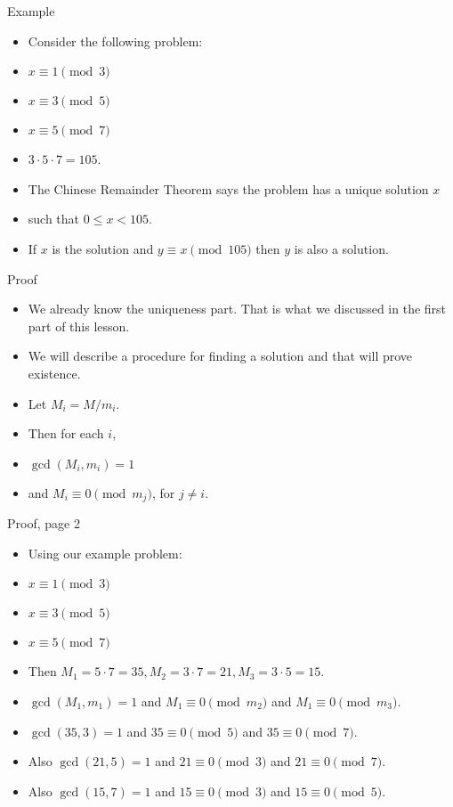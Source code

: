 \documentclass[handout]{beamer}
\begin{document}
\begin{frame}{Example}

\begin{itemize}
  \item Consider the following problem:
  \item $x \equiv 1 \pmod 3$
  \item $x \equiv 3 \pmod 5$
  \item $x \equiv 5 \pmod 7$
  \item $3\cdot 5 \cdot 7 = 105$.
  \item The Chinese Remainder Theorem says the problem has a unique solution $x$
  \item such that $0\leq x < 105$.
  \item If $x$ is the solution and $y\equiv x \pmod {105}$ then $y$ is also a solution.
\end{itemize}

\end{frame}

\begin{frame}{Proof}

\begin{itemize}
  \item We already know the uniqueness part. That is what we discussed in the first part of this lesson.
  \item We will describe a procedure for finding a solution and that will prove existence.
  \item Let $M_i = M/{m_i}$.
  \item Then for each $i$,
  \item $\gcd(M_i, m_i) = 1$
  \item and $M_i \equiv 0 \pmod {m_j}$, for $j\not= i$.

\end{itemize}

\end{frame}

\begin{frame}{Proof, page 2}

\begin{itemize}
  \item Using our example problem:
  \item $x \equiv 1 \pmod 3$
  \item $x \equiv 3 \pmod 5$
  \item $x \equiv 5 \pmod 7$
  \item Then $M_1 = 5\cdot 7 = 35, M_2 = 3\cdot 7 = 21, M_3 = 3\cdot 5 = 15$.
  \item $\gcd(M_1, m_1) = 1$ and $M_1 \equiv 0 \pmod {m_2}$ and $M_1 \equiv 0 \pmod {m_3}$.
  \item $\gcd(35,3) = 1$ and $35\equiv 0 \pmod 5$ and $35 \equiv 0 \pmod 7$.
  \item Also $\gcd(21,5) = 1$ and $21\equiv 0 \pmod 3$ and $21 \equiv 0 \pmod 7$.
  \item Also $\gcd(15,7) = 1$ and $15\equiv 0 \pmod 3$ and $15 \equiv 0 \pmod 5$.

\end{itemize}

\end{frame}
\end{document}
